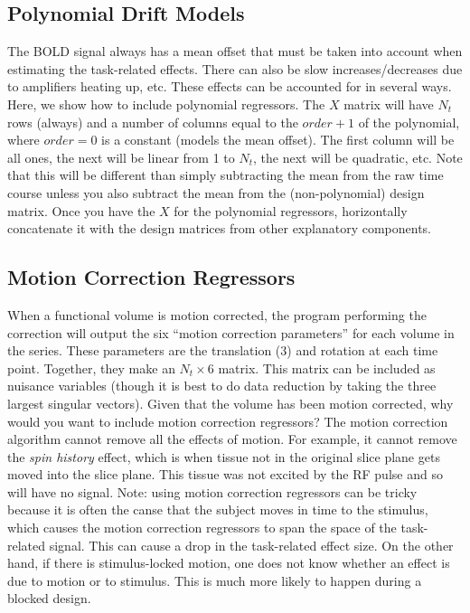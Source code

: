 \documentclass{article}
\begin{document}
\subsection{Polynomial Drift Models}

\noindent
The BOLD signal always has a mean offset that must be taken into
account when estimating the task-related effects. There can also be
slow increases/decreases due to amplifiers heating up, etc.
These effects can be accounted for in several ways. Here, we show how 
to include polynomial regressors. The $X$ matrix will have $N_t$ rows
(always) and a number of columns equal to the $order+1$ of the
polynomial, where $order=0$ is a constant (models the mean
offset). The first column will be all ones, the next will be linear
from 1 to $N_t$, the next will be quadratic, etc. Note that this will
be different than simply subtracting the mean from the raw time course
unless you also subtract the mean from the (non-polynomial) design
matrix. Once you have the $X$ for the polynomial regressors,
horizontally concatenate it with the design matrices from other
explanatory components.

\subsection{Motion Correction Regressors}

\noindent
When a functional volume is motion corrected, the program performing
the correction will output the six ``motion correction parameters''
for each volume in the series. These parameters are the translation
(3) and rotation at each time point. Together, they make an $N_t
\times 6$ matrix. This matrix can be included as nuisance variables
(though it is best to do data reduction by taking the three largest
singular vectors). Given that the volume has been motion corrected,
why would you want to include motion correction regressors? The motion
correction algorithm cannot remove all the effects of motion. For
example, it cannot remove the {\em spin history} effect, which is when
tissue not in the original slice plane gets moved into the slice
plane. This tissue was not excited by the RF pulse and so will have no
signal. Note: using motion correction regressors can be tricky because
it is often the canse that the subject moves in time to the stimulus,
which causes the motion correction regressors to span the space of the
task-related signal. This can cause a drop in the task-related effect
size. On the other hand, if there is stimulus-locked motion, one does
not know whether an effect is due to motion or to stimulus. This is
much more likely to happen during a blocked design.
\end{document}
